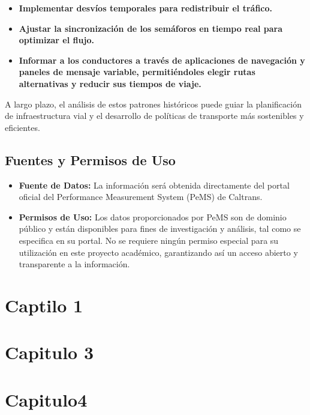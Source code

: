\documentclass[
]{book}
\begin{document}
\begin{itemize}
\item
  \textbf{Implementar desvíos temporales para redistribuir el tráfico.}
\item
  \textbf{Ajustar la sincronización de los semáforos en tiempo real para optimizar el flujo.}
\item
  \textbf{Informar a los conductores a través de aplicaciones de navegación y paneles de mensaje variable, permitiéndoles elegir rutas alternativas y reducir sus tiempos de viaje.}
\end{itemize}

A largo plazo, el análisis de estos patrones históricos puede guiar la planificación de infraestructura vial y el desarrollo de políticas de transporte más sostenibles y eficientes.

\section{Fuentes y Permisos de Uso}\label{fuentes-y-permisos-de-uso}

\begin{itemize}
\item
  \textbf{Fuente de Datos:} La información será obtenida directamente del portal oficial del Performance Measurement System (PeMS) de Caltrans.
\item
  \textbf{Permisos de Uso:} Los datos proporcionados por PeMS son de dominio público y están disponibles para fines de investigación y análisis, tal como se especifica en su portal. No se requiere ningún permiso especial para su utilización en este proyecto académico, garantizando así un acceso abierto y transparente a la información.
\end{itemize}

\chapter{Captilo 1}\label{captilo-1}

\chapter{Capitulo 3}\label{capitulo-3}

\chapter{Capitulo4}\label{capitulo4}


\end{document}
